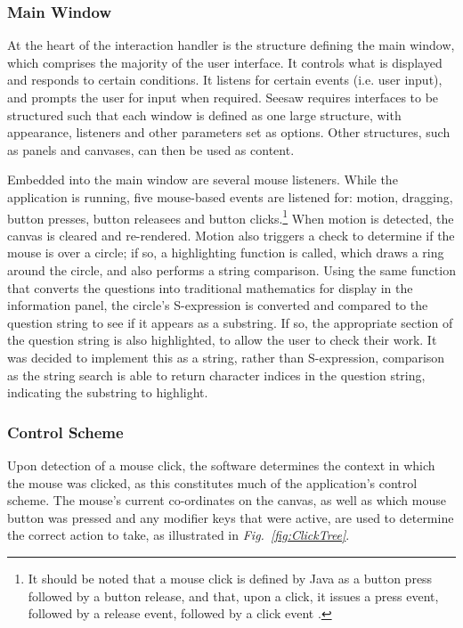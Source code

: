 \documentclass[12pt,twoside,notitlepage,xetex]{report}
\begin{document}
\subsubsection{Main Window}

At the heart of the interaction handler is the structure defining the main window, which comprises the majority of the user interface.  It controls what is displayed and responds to certain conditions.  It listens for certain events (i.e. user input), and prompts the user for input when required.  Seesaw requires interfaces to be structured such that each window is defined as one large structure, with appearance, listeners and other parameters set as options.  Other structures, such as panels and canvases, can then be used as content.

Embedded into the main window are several mouse listeners.  While the application is running, five mouse-based events are listened for: motion, dragging, button presses, button releasees and button clicks.\footnote{It should be noted that a mouse click is defined by Java as a button press followed by a button release, and that, upon a click, it issues a press event, followed by a release event, followed by a click event \cite{JavaApi}.}  When motion is detected, the canvas is cleared and re-rendered.  Motion also triggers a check to determine if the mouse is over a circle; if so, a highlighting function is called, which draws a ring around the circle, and also performs a string comparison.  Using the same function that converts the questions into traditional mathematics for display in the information panel, the circle's S-expression is converted and compared to the question string to see if it appears as a substring.  If so, the appropriate section of the question string is also highlighted, to allow the user to check their work.  It was decided to implement this as a string, rather than S-expression, comparison as the string search is able to return character indices in the question string, indicating the substring to highlight.

\subsubsection{Control Scheme}

Upon detection of a mouse click, the software determines the context in which the mouse was clicked, as this constitutes much of the application's control scheme.  The mouse's current co-ordinates on the canvas, as well as which mouse button was pressed and any modifier keys that were active, are used to determine the correct action to take, as illustrated in \emph{Fig.~\ref{fig:ClickTree}}.
\end{document}

